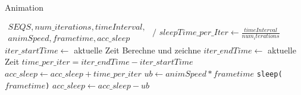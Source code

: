 \begin{algorithm}[H]
\caption{Animation}\label{alg:anim}
\begin{algorithmic}[1]
\Require $\begin{array}{l}  
SEQS, num\_iterations, timeInterval, \\  
animSpeed, frametime, acc\_sleep  
\end{array}$
\Ensure $/$
        \State $sleepTime\_per\_Iter \gets \frac{timeInterval}{num_iterations}$ 
        \State $iter\_startTime \gets$ aktuelle Zeit 
        \State Berechne und zeichne 
        \State $iter\_endTime \gets$ aktuelle Zeit 
        \State $time\_per\_iter = iter\_endTime - iter\_startTime$ 
        \State  $acc\_sleep \gets acc\_sleep + time\_per\_iter$
        \State $ub \gets animSpeed * frametime$
        	\State \texttt{sleep($frametime$)} 
        	\State $acc\_sleep \gets acc\_sleep - ub$
        \EndIf
    \EndFor
\EndWhile
\end{algorithmic}
\end{algorithm}